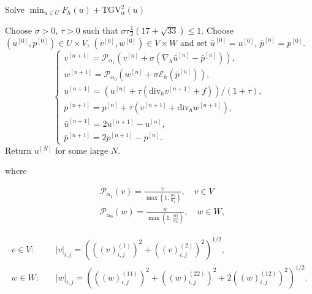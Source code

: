 \documentclass{article}
\begin{document}
\begin{algorithm}[H]
    \caption{Solve $\min_{u \in U} F_h(u) + \mathrm{TGV}^2_{\alpha}(u)$}
    \begin{algorithmic}[1]
    \State Choose $\sigma > 0$, $\tau > 0$ such that $\sigma \tau \frac{1}{2} (17 + \sqrt{33}) \leq 1$.
    \State Choose $(u^{[0]}, p^{[0]}) \in U \times V$, $(v^{[0]}, w^{[0]}) \in V \times W$ and set $\bar{u}^{[0]} = u^{[0]}$, $\bar{p}^{[0]} = p^{[0]}$.
        \State \begin{equation*}
        \begin{cases}
        v^{[n+1]} = \mathcal{P}_{\alpha_1} \left( v^{[n]} + \sigma (\nabla_h \bar{u}^{[n]} - \bar{p}^{[n]}) \right), \\
        w^{[n+1]} = \mathcal{P}_{\alpha_0} \left( w^{[n]} + \sigma \mathcal{E}_h (\bar{p}^{[n]}) \right), \\
        u^{[n+1]} = \left( u^{[n]} + \tau (\text{div}_h v^{[n+1]} + f) \right) / ( 1 + \tau ), \\
        p^{[n+1]} = p^{[n]} + \tau (v^{[n+1]} + \text{div}_h w^{[n+1]}), \\
        \bar{u}^{[n+1]} = 2u^{[n+1]} - u^{[n]}, \\
        \bar{p}^{[n+1]} = 2p^{[n+1]} - p^{[n]}.
        \end{cases}
        \end{equation*}
    \EndFor
    \State Return $u^{[N]}$ for some large $N$.
    \end{algorithmic}
    \label{alg:pdhg}
\end{algorithm}

where 

\begin{equation}
    \begin{aligned}
    & \mathcal{P}_{\alpha_1}(v) = \frac{v}{\max \left(1, \frac{|v|}{\alpha_1}\right)}, \quad v \in V \\
    & \mathcal{P}_{\alpha_0}(w) = \frac{w}{\max \left(1, \frac{|w|}{\alpha_0}\right)}, \quad w \in W,
    \end{aligned}
\end{equation}



\begin{equation}
    \begin{aligned}
    v \in V : \quad &|v|_{i,j} = \left( \left( (v)_{i,j}^{(1)} \right)^{2} + \left( (v)_{i,j}^{(2)} \right)^{2} \right)^{1/2}, \\
    w \in W : \quad &|w|_{i,j} = \left( \left( (w)_{i,j}^{(11)} \right)^{2} + \left( (w)_{i,j}^{(22)} \right)^{2} + 2 \left( (w)_{i,j}^{(12)} \right)^{2} \right)^{1/2}.
    \end{aligned}
\end{equation}
\end{document}
